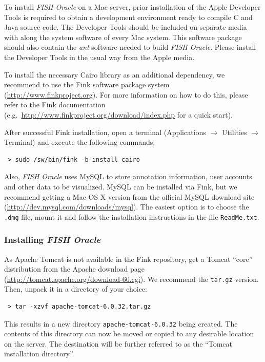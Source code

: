 \documentclass[11pt,final]{article}
\newcommand{\FO}[0]{\emph{FISH Oracle}\xspace}
\begin{document}
To install \FO on a Mac server, prior installation of the Apple Developer
Tools is required to obtain a development environment ready to compile C and
Java source code. The Developer Tools should be included on separate media with
along the system software of every Mac system. This software package should
also contain the \emph{ant} software needed to build \FO. Please install the
Developer Tools in the usual way from the Apple media.

To install the necessary Cairo library as an additional dependency,
we recommend to use the Fink software package system
(\url{http://www.finkproject.org}).
For more information on how to do this, please refer to the Fink documentation
(e.g.\ \url{http://www.finkproject.org/download/index.php} for a quick start).

After successful Fink installation, open a terminal
(Applications $\rightarrow$ Utilities $\rightarrow$ Terminal)
and execute the following commands:

\begin{lstlisting}
 > sudo /sw/bin/fink -b install cairo
\end{lstlisting}

Also, \FO uses MySQL to store annotation information, user accounts and
other data to be visualized. MySQL can be installed via Fink, but we recommend
getting a Mac OS X version from the official MySQL download site
(\url{http://dev.mysql.com/downloads/mysql}). The easiest option is to choose
the \texttt{.dmg} file, mount it and follow the installation instructions in
the file \texttt{ReadMe.txt}.


\subsubsection*{Installing \FO}

As Apache Tomcat is not available in the Fink repository, get a Tomcat
``core'' distribution from the Apache download page
(\url{http://tomcat.apache.org/download-60.cgi}). We recommend the
\texttt{tar.gz} version. Then, unpack it in a directory of your choice:

\begin{lstlisting}
 > tar -xzvf apache-tomcat-6.0.32.tar.gz
\end{lstlisting}

This results in a new directory \texttt{apache-tomcat-6.0.32} being created.
The contents of this directory can now be moved or copied to any desirable
location on the server. The destination will be further referred to as the
``Tomcat installation directory''.
\end{document}
